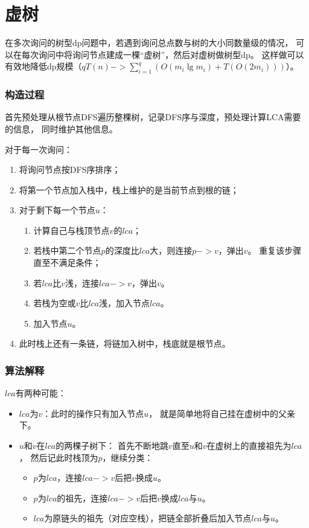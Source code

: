 \section{虚树}
在多次询问的树型dp问题中，若遇到询问总点数与树的大小同数量级的情况，
可以在每次询问中将询问节点建成一棵``虚树''，然后对虚树做树型dp。
这样做可以有效地降低dp规模（$\displaystyle qT(n)->
\sum_{i=1}^q{\left(O(m_i\lg m_i)+T(O(2m_i))\right)}$）。

\subsubsection{构造过程}

首先预处理从根节点DFS遍历整棵树，记录DFS序与深度，预处理计算LCA需要的信息，
同时维护其他信息。

对于每一次询问：
\begin{enumerate}
    \item 将询问节点按DFS序排序；
    \item 将第一个节点加入栈中，栈上维护的是当前节点到根的链；
    \item 对于剩下每一个节点$u$：
    \begin{enumerate}
        \item 计算自己与栈顶节点$v$的$lca$；
        \item 若栈中第二个节点$p$的深度比$lca$大，则连接$p->v$，弹出$v$。
        重复该步骤直至不满足条件；
        \item 若$lca$比$v$浅，连接$lca->v$，弹出$v$。
        \item 若栈为空或$v$比$lca$浅，加入节点$lca$。
        \item 加入节点$u$。
    \end{enumerate}
    \item 此时栈上还有一条链，将链加入树中，栈底就是根节点。
\end{enumerate}
\subsubsection{算法解释}

$lca$有两种可能：
\begin{itemize}
    \item $lca$为$v$：此时的操作只有加入节点$u$，
    就是简单地将自己挂在虚树中的父亲下。
    \item $u$和$v$在$lca$的两棵子树下：
    首先不断地跳$v$直至$u$和$v$在虚树上的直接祖先为$lca$，
    然后记此时栈顶为$p$，继续分类：
    \begin{itemize}
        \item $p$为$lca$，连接$lca->v$后把$v$换成$u$。
        \item $p$为$lca$的祖先，连接$lca->v$后把$v$换成$lca$与$u$。
        \item $lca$为原链头的祖先（对应空栈），把链全部折叠后加入节点$lca$与$u$。
    \end{itemize}
\end{itemize}

